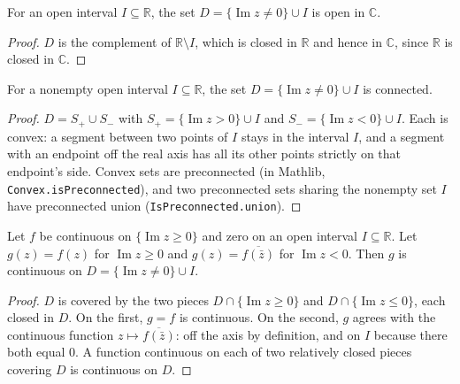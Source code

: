 \begin{lemma}
    \label{lmm:reflection-domain-open}
    \leanok
    For an open interval $I \subseteq \mathbb{R}$, the set $D = \{\operatorname{Im} z \ne 0\} \cup I$ is open in $\mathbb{C}$.
\end{lemma}
\begin{proof}
    \leanok
    $D$ is the complement of $\mathbb{R} \setminus I$, which is closed in $\mathbb{R}$ and hence in $\mathbb{C}$, since $\mathbb{R}$ is closed in $\mathbb{C}$.
\end{proof}

\begin{lemma}
    \label{lmm:reflection-domain-connected}
    \leanok
    For a nonempty open interval $I \subseteq \mathbb{R}$, the set $D = \{\operatorname{Im} z \ne 0\} \cup I$ is connected.
\end{lemma}
\begin{proof}
    \leanok
    $D = S_+ \cup S_-$ with $S_+ = \{\operatorname{Im} z > 0\} \cup I$ and $S_- = \{\operatorname{Im} z < 0\} \cup I$. Each is convex: a segment between two points of $I$ stays in the interval $I$, and a segment with an endpoint off the real axis has all its other points strictly on that endpoint's side. Convex sets are preconnected (in Mathlib, \texttt{Convex.isPreconnected}), and two preconnected sets sharing the nonempty set $I$ have preconnected union (\texttt{IsPreconnected.union}).
\end{proof}

\begin{lemma}
    \label{lmm:schwarz-reflection-continuous}
    \leanok
    Let $f$ be continuous on $\{\operatorname{Im} z \ge 0\}$ and zero on an open interval $I \subseteq \mathbb{R}$. Let $g(z) = f(z)$ for $\operatorname{Im} z \ge 0$ and $g(z) = \overline{f(\bar z)}$ for $\operatorname{Im} z < 0$. Then $g$ is continuous on $D = \{\operatorname{Im} z \ne 0\} \cup I$.
\end{lemma}
\begin{proof}
    \leanok
    $D$ is covered by the two pieces $D \cap \{\operatorname{Im} z \ge 0\}$ and $D \cap \{\operatorname{Im} z \le 0\}$, each closed in $D$. On the first, $g = f$ is continuous. On the second, $g$ agrees with the continuous function $z \mapsto \overline{f(\bar z)}$: off the axis by definition, and on $I$ because there both equal $0$. A function continuous on each of two relatively closed pieces covering $D$ is continuous on $D$.
\end{proof}

